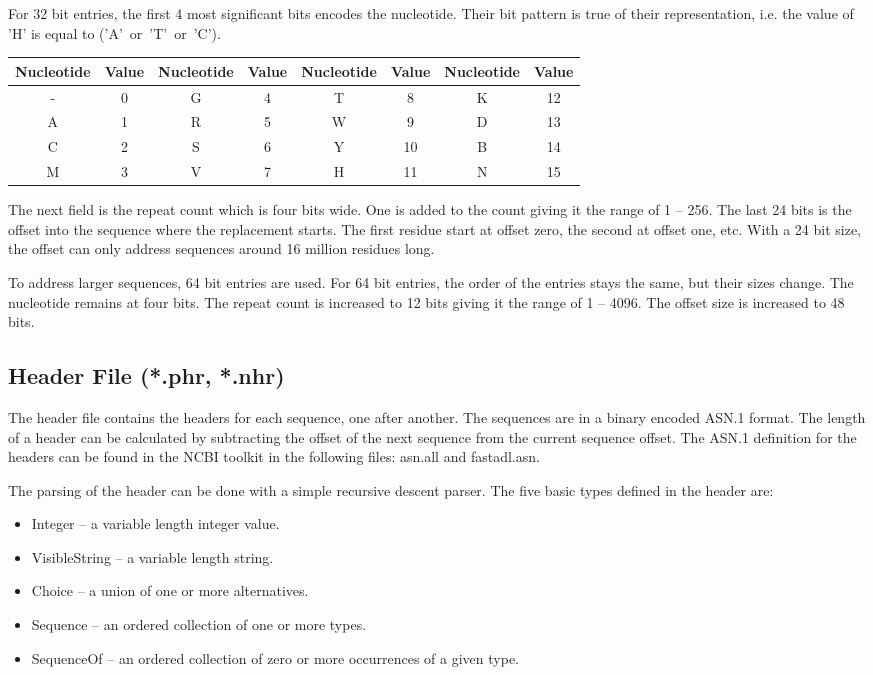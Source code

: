 For 32 bit
entries, the first 4 most significant bits encodes the nucleotide.
Their bit pattern is 
true of their representation, i.e. the value of 'H' is equal 
to ('A'~or~'T'~or~'C').  

\bigskip
\begin{center}
\begin{tabular}{|c|c|c|c|c|c|c|c|} \hline
Nucleotide & Value & Nucleotide & Value & Nucleotide & Value & Nucleotide & Value \\ \hline
- & 0 & G & 4 & T & 8  & K & 12 \\ \hline
A & 1 & R & 5 & W & 9  & D & 13 \\ \hline
C & 2 & S & 6 & Y & 10 & B & 14 \\ \hline
M & 3 & V & 7 & H & 11 & N & 15 \\ \hline
\end{tabular}
\end{center}
\bigskip

The next field is the repeat count which is four bits wide. 
One is added to the count giving it the range of 1 -- 256.  
The last 24 bits is the offset into the sequence where the
replacement starts.  The first residue start at offset zero,
the second at offset one, etc.  With a 24 bit size, the offset
can only address sequences around 16 million residues long.

To address larger sequences, 64 bit
entries are used.  For 64 bit entries, the order of the entries stays the same, 
but their sizes change.  The nucleotide remains at four bits.
The repeat count is increased to 12 bits giving it the range 
of 1 -- 4096.  The offset size is increased to 48 bits.


\subsection{Header File (*.phr, *.nhr)}

The header file contains the headers for each sequence, one after another.  
The sequences are in a binary encoded ASN.1 format.  The length 
of a header can be calculated by subtracting the offset of the 
next sequence from the current sequence offset.  The ASN.1 definition 
for the headers can be found in the NCBI toolkit in the following 
files: asn.all and fastadl.asn.

The parsing of the header can be done with a simple recursive 
descent parser.  The five basic types defined in the header are:

\begin{itemize}
\item Integer -- a variable length integer value.
\item VisibleString -- a variable length string.
\item Choice -- a union of one or more alternatives.  
\item Sequence -- an ordered collection of one or more types.  
\item SequenceOf -- an ordered collection of zero or more occurrences 
of a given type.
\end{itemize} 


